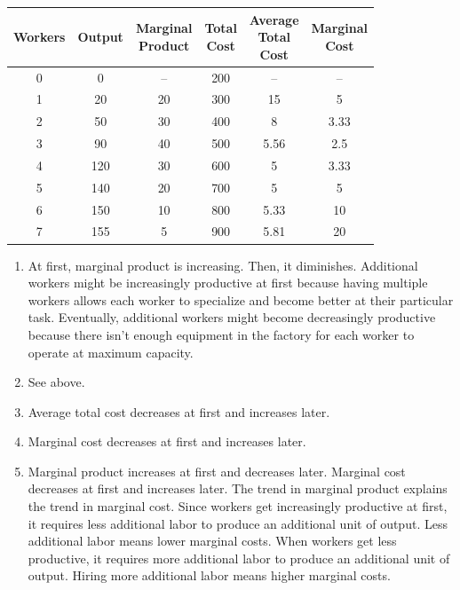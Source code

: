 \documentclass{article}
\begin{document}
\begin{enumerate}
	\begin{center}
	\begin{tabular}{| c | c | c | c | c | c |}
	\hline
	Workers & Output & \makecell{Marginal\\Product} & \makecell{Total\\Cost} & \makecell{Average\\Total\\Cost} & \makecell{Marginal\\Cost} \\
	\hline
	0 & 0 & -- & 200 & -- & -- \\
	\hline
	1 & 20 & 20 & 300 & 15 & 5 \\
	\hline
	2 & 50 & 30 & 400 & 8 & 3.33 \\
	\hline
	3 & 90 & 40 & 500 & 5.56 & 2.5 \\
	\hline
	4 & 120 & 30 & 600 & 5 & 3.33 \\
	\hline
	5 & 140 & 20 & 700 & 5 & 5 \\
	\hline
	6 & 150 & 10 & 800 & 5.33 & 10 \\
	\hline
	7 & 155 & 5 & 900 & 5.81 & 20 \\
	\hline
	\end{tabular}
	\end{center}
	
	\begin{enumerate}
	
	\item At first, marginal product is increasing. Then, it diminishes. Additional workers might be increasingly productive at first because having multiple workers allows each worker to specialize and become better at their particular task. Eventually, additional workers might become decreasingly productive because there isn't enough equipment in the factory for each worker to operate at maximum capacity. 
	
	\item See above.
	
	\item Average total cost decreases at first and increases later.
	
	\item Marginal cost decreases at first and increases later.
	
	\item Marginal product increases at first and decreases later. Marginal cost decreases at first and increases later. The trend in marginal product explains the trend in marginal cost. Since workers get increasingly productive at first, it requires less additional labor to produce an additional unit of output. Less additional labor means lower marginal costs. When workers get less productive, it requires more additional labor to produce an additional unit of output. Hiring more additional labor means higher marginal costs.
	

\end{enumerate}
\end{enumerate}
\end{document}
